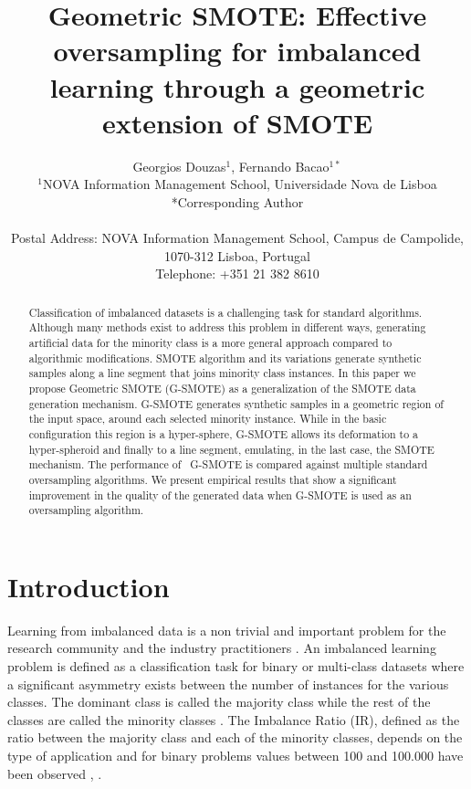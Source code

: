 \documentclass[parskip=full]{scrartcl}
\title{Geometric SMOTE: Effective oversampling for imbalanced learning through a geometric extension of SMOTE}
\author{
	Georgios Douzas\(^{1}\), Fernando Bacao\(^{1*}\)
	\\
	\small{\(^{1}\)NOVA Information Management School, Universidade Nova de Lisboa}
	\\
	\small{*Corresponding Author}
	\\
	\\
	\small{Postal Address: NOVA Information Management School, Campus de Campolide, 1070-312 Lisboa, Portugal}
	\\
	\small{Telephone: +351 21 382 8610}
}
\date{}
\begin{document}
\maketitle

\begin{abstract}
Classification of imbalanced datasets is a challenging task for standard algorithms. Although many methods exist to address this problem in different ways, generating artificial data for the minority class is a more general approach compared to algorithmic modifications. SMOTE algorithm and its variations generate synthetic samples along a line segment that joins minority class instances. In this paper we propose Geometric SMOTE (G-SMOTE) as a generalization of the SMOTE data generation mechanism. G-SMOTE generates synthetic samples in a geometric region of the input space, around each selected minority instance. While in the basic configuration this region is a hyper-sphere, G-SMOTE allows its deformation to a hyper-spheroid and finally to a line segment, emulating, in the last case, the SMOTE mechanism. The performance of  G-SMOTE is compared against multiple standard oversampling algorithms. We present empirical results that show a significant improvement in the quality of the generated data when G-SMOTE is used as an oversampling algorithm.
\end{abstract}

\section{Introduction}
Learning from imbalanced data is a non trivial and important problem for the research community and the industry practitioners \cite{Chawla2003}. An imbalanced learning problem is defined as a classification task for binary or multi-class datasets where a significant asymmetry exists between the number of instances for the various classes. The dominant class is called the majority class while the rest of the classes are called the minority classes \cite{Chawla2003}. The Imbalance Ratio (IR), defined as the ratio between the majority class and each of the minority classes, depends on the type of application and for binary problems values between 100 and 100.000 have been observed \cite{Chawla2002}, \cite{Barua2014}.
\end{document}
